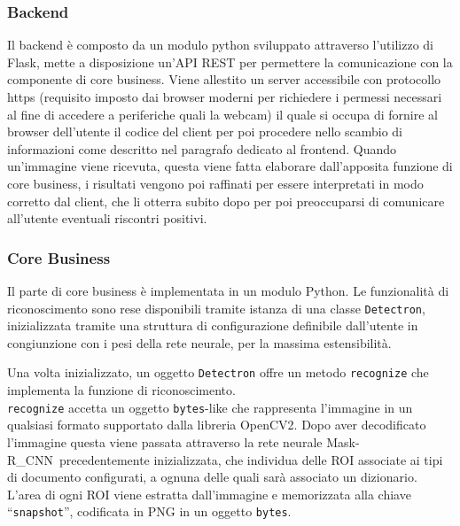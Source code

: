\documentclass[12pt,a4paper]{article}
\newcommand{\mrcnn}{Mask-R\_CNN}
\begin{document}
\subsubsection{Backend}

Il backend è composto da un modulo python sviluppato attraverso l'utilizzo di Flask,
mette a disposizione un'API REST per permettere la
comunicazione con la componente di core business. Viene
allestito un server accessibile con protocollo https (requisito imposto dai
browser moderni per richiedere i permessi necessari al fine di accedere
a periferiche quali la webcam) il quale si occupa di fornire al browser
dell'utente il codice del client per poi procedere nello scambio di
informazioni come descritto nel paragrafo dedicato al frontend. Quando
un'immagine viene ricevuta, questa viene fatta elaborare dall'apposita
funzione di core business, i risultati vengono poi raffinati per essere
interpretati in modo corretto dal client, che li otterra subito dopo
per poi preoccuparsi di comunicare all'utente eventuali riscontri positivi.

\subsubsection{Core Business}

Il parte di core business è implementata in un modulo Python. Le
funzionalità di riconoscimento sono rese disponibili tramite istanza di
una classe \texttt{Detectron}, inizializzata tramite una struttura di
configurazione definibile dall'utente in congiunzione con i pesi della
rete neurale, per la massima estensibilità.

Una volta inizializzato, un oggetto \texttt{Detectron} offre un metodo
\texttt{recognize} che implementa la funzione di riconoscimento.\\
\texttt{recognize} accetta un oggetto \texttt{bytes}-like che
rappresenta l'immagine in un qualsiasi formato supportato dalla libreria
OpenCV2. Dopo aver decodificato l'immagine questa viene passata
attraverso la rete neurale \mrcnn\ precedentemente inizializzata, che
individua delle ROI associate ai tipi di documento configurati, a ognuna
delle quali sarà associato un dizionario. L'area di ogni ROI viene
estratta dall'immagine e memorizzata alla chiave ``\texttt{snapshot}'',
codificata in PNG in un oggetto \texttt{bytes}.
\end{document}
